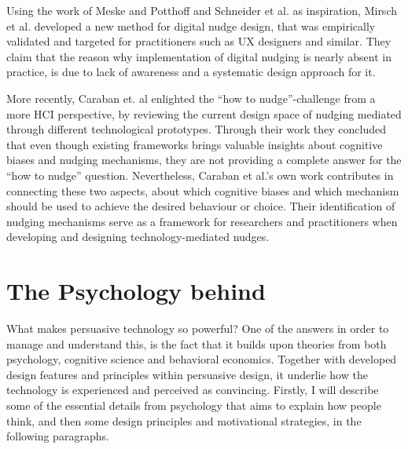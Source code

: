 Using the work of Meske and Potthoff 
\cite{meske_dinu-model_2017}
and Schneider et al. 
\cite{schneider_digital_2018}
as inspiration, Mirsch et al.\cite{mirsch_making_2018} developed a new method for digital nudge design, that was empirically validated and targeted for practitioners such as UX designers and similar.
They claim that the reason why implementation of digital nudging is nearly absent in practice, is due to lack of awareness and a systematic design approach for it.

More recently, Caraban et. al \cite{caraban_23_2019} enlighted the “how to nudge”-challenge from a more HCI perspective, by reviewing the current design space of nudging mediated through different technological prototypes. Through their work they concluded that even though existing frameworks 
brings valuable insights about cognitive biases and nudging mechanisms, they are not providing a complete answer for the “how to nudge” question. Nevertheless, Caraban et al.’s own work contributes in connecting these two aspects, about which cognitive biases and which mechanism should be used to achieve the desired behaviour or choice. Their identification of nudging mechanisms serve as a framework for researchers and practitioners when developing and designing technology-mediated nudges. 

\section{The Psychology behind }
What makes persuasive technology so powerful? One of the answers in order to manage and understand this, is the fact that it builds upon theories from both psychology, cognitive science and behavioral economics. Together with developed design features and principles within persuasive design, it underlie how the technology is experienced and perceived as convincing. Firstly, I will describe some of the essential details from psychology that aims to explain how people think, and then some design principles and motivational strategies, in the following paragraphs. 

